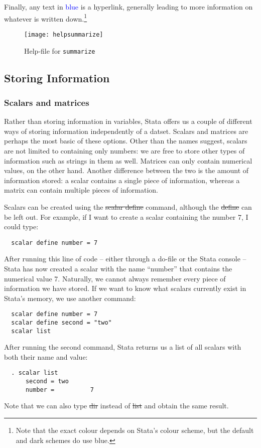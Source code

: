 Finally, any text in \textcolor{blue}{blue} is a hyperlink,
generally leading to more information on whatever is written down.\footnote{Note that the exact colour depends on Stata's colour scheme, but the default and dark schemes do use blue.}

\begin{figure}[tbp]\centering
  \caption{Help-file for \texttt{summarize}}\label{fig:hlpsum}
  \vspace{1ex}
  \texttt{[image: helpsummarize]}
\end{figure}

\subsection{Storing Information}

\subsubsection{Scalars and matrices}

Rather than storing information in variables,
Stata offers us a couple of different ways of storing information independently of a datset.
Scalars and matrices are perhaps the most basic of these options.
Other than the names suggest, scalars are not limited to containing only numbers:
we are free to store other types of information such as strings in them as well.
Matrices can only contain numerical values, on the other hand.
Another difference between the two is the amount of information stored:
a scalar contains a single piece of information,
whereas a matrix can contain multiple pieces of information.

Scalars can be created using the \st{scalar define} command,
although the \st{define} can be left out.
For example,
if I want to create a scalar containing the number 7,
I could type:
\begin{verbatim}
  scalar define number = 7
\end{verbatim}

After running this line of code -- either through a do-file or the Stata console -- Stata has now created a scalar with the name ``number'' that contains the numerical value 7.
Naturally, we cannot always remember every piece of information we have stored.
If we want to know what scalars currently exist in Stata's memory, we use another command:
\begin{verbatim}
  scalar define number = 7
  scalar define second = "two"
  scalar list
\end{verbatim}
After running the second command, Stata returns us a list of all scalars with both their name and value:
\small\begin{verbatim}
  . scalar list
      second = two
      number =          7
\end{verbatim}\normalsize
Note that we can also type \st{dir} instead of \st{list} and obtain the same result.

